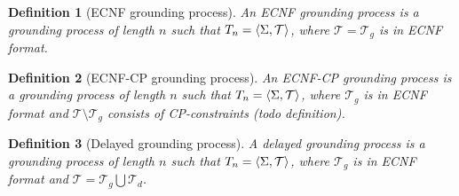 \documentclass{article}
\newcommand{\seq}[1]{\left\langle#1\right\rangle}
\newcommand{\T}{\mathcal{T}}
\newcommand{\Tg}{\mathcal{T}_g}
\newcommand{\Td}{\mathcal{T}_d}
\newcommand{\pg}{\seq{\voc,\T}}
\newtheorem{definition}{Definition}
\begin{document}
\begin{definition}[ECNF grounding process]
	An ECNF grounding process is a grounding process of length $n$ such that $T_n=\pg$, where $\T = \Tg$ is in ECNF format.
\end{definition}


\begin{definition}[ECNF-CP grounding process]
	An ECNF-CP grounding process is a grounding process of length $n$ such that $T_n=\pg$, where $\Tg$ is in ECNF format and $\T\setminus \Tg$ consists of CP-constraints (todo definition).
\end{definition}

\begin{definition}[Delayed grounding process]
	A delayed grounding process is a grounding process of length $n$ such that $T_n=\pg$, where $\Tg$ is in ECNF format and $\T = \Tg \bigcup \Td$.
\end{definition}
\end{document}
